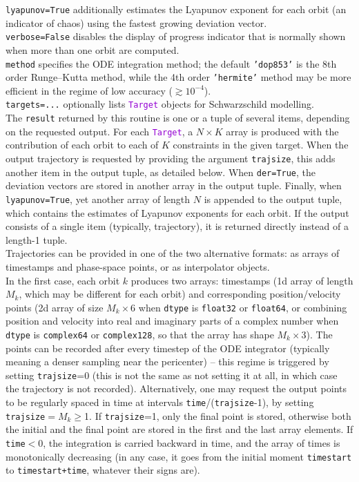\documentclass[12pt]{article}
\newcommand{\ttt}[1]{\textcolor{darkviolet}{\texttt{#1}}}
\newcommand{\ppp}[1]{\textcolor{darkolive} {\texttt{#1}}}
\begin{document}
\ppp{lyapunov}\texttt{=True} additionally estimates the Lyapunov exponent for each orbit (an indicator of chaos) using the fastest growing deviation vector.\\
\ppp{verbose}\texttt{=False} disables the display of progress indicator that is normally shown when more than one orbit are computed.\\
\ppp{method} specifies the ODE integration method; the default \texttt{'dop853'} is the 8th order Runge--Kutta method, while the 4th order \texttt{'hermite'} method may be more efficient in the regime of low accuracy ($\gtrsim 10^{-4}$).\\
\ppp{targets=...} optionally lists \ttt{Target} objects for Schwarzschild modelling. \\[2mm]
The \texttt{result} returned by this routine is one or a tuple of several items, depending on the requested output. For each \ttt{Target}, a $N\times K$ array is produced with the contribution of each orbit to each of $K$ constraints in the given target. When the output trajectory is requested by providing the argument \ppp{trajsize}, this adds another item in the output tuple, as detailed below. When \ppp{der}\texttt{=True}, the deviation vectors are stored in another array in the output tuple. Finally, when \ppp{lyapunov}\texttt{=True}, yet another array of length $N$ is appended to the output tuple, which contains the estimates of Lyapunov exponents for each orbit. If the output consists of a single item (typically, trajectory), it is returned directly instead of a length-1 tuple.\\[1mm]
Trajectories can be provided in one of the two alternative formats: as arrays of timestamps and phase-space points, or as interpolator objects.\\
In the first case, each orbit $k$ produces two arrays: timestamps (1d array of length $M_k$, which may be different for each orbit) and corresponding position/velocity points (2d array of size $M_k \times 6$ when \ppp{dtype} is \texttt{float32} or \texttt{float64}, or combining position and velocity into real and imaginary parts of a complex number when \ppp{dtype} is \texttt{complex64} or \texttt{complex128}, so that the array has shape $M_k \times 3$). The points can be recorded after every timestep of the ODE integrator (typically meaning a denser sampling near the pericenter) -- this regime is triggered by setting \ppp{trajsize}=0 (this is not the same as not setting it at all, in which case the trajectory is not recorded). Alternatively, one may request the output points to be regularly spaced in time at intervals \texttt{time}/(\texttt{trajsize}-1), by setting \ppp{trajsize}${}=M_k\ge$1. If \ppp{trajsize}=1, only the final point is stored, otherwise both the initial and the final point are stored in the first and the last array elements. If \ppp{time}$<0$, the integration is carried backward in time, and the array of times is monotonically decreasing (in any case, it goes from the initial moment \ppp{timestart} to \ppp{timestart+time}, whatever their signs are).
\end{document}
